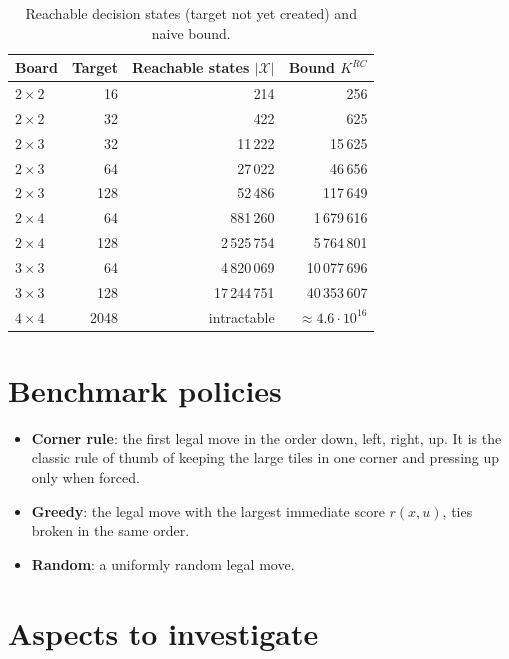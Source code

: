 \documentclass[11pt,a4paper]{article}
\theoremstyle{remark}
\newcommand{\X}{\mathcal{X}}
\newcommand{\act}[1]{\textsf{#1}}
\begin{document}
\begin{table}[ht]
\centering
\begin{tabular}{lrrr}
\toprule
Board & Target & Reachable states $|\X|$ & Bound $K^{RC}$\\
\midrule
$2\times2$ & 16 & 214 & 256\\
$2\times2$ & 32 & 422 & 625\\
$2\times3$ & 32 & 11\,222 & 15\,625\\
$2\times3$ & 64 & 27\,022 & 46\,656\\
$2\times3$ & 128 & 52\,486 & 117\,649\\
$2\times4$ & 64 & 881\,260 & 1\,679\,616\\
$2\times4$ & 128 & 2\,525\,754 & 5\,764\,801\\
$3\times3$ & 64 & 4\,820\,069 & 10\,077\,696\\
$3\times3$ & 128 & 17\,244\,751 & 40\,353\,607\\
$4\times4$ & 2048 & intractable & $\approx 4.6\cdot10^{16}$\\
\bottomrule
\end{tabular}
\caption{Reachable decision states (target not yet created) and naive bound.}
\label{tab:states}
\end{table}

\section{Benchmark policies}

\begin{itemize}[leftmargin=*]
\item \textbf{Corner rule}: the first legal move in the order \act{down}, \act{left}, \act{right}, \act{up}. It is the classic rule of thumb of keeping the large tiles in one corner and pressing \act{up} only when forced.
\item \textbf{Greedy}: the legal move with the largest immediate score $r(x,u)$, ties broken in the same order.
\item \textbf{Random}: a uniformly random legal move.
\end{itemize}

\section{Aspects to investigate}
\end{document}

